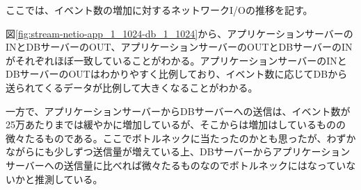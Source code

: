 \documentclass[../../../../../main]{subfiles}
\begin{document}
    \label{subsubsec:result-chunk-only-limit-diskio}

    ここでは、イベント数の増加に対するネットワークI/Oの推移を記す。

    

    図\ref{fig:stream-netio-app_1_1024-db_1_1024}から、アプリケーションサーバーのINとDBサーバーのOUT、アプリケーションサーバーのOUTとDBサーバーのINがそれぞれほぼ一致していることがわかる。アプリケーションサーバーのINとDBサーバーのOUTはわかりやすく比例しており、イベント数に応じてDBから送られてくるデータが比例して大きくなることがわかる。

    一方で、アプリケーションサーバーからDBサーバーへの送信は、イベント数が25万あたりまでは緩やかに増加しているが、そこからは増加はしているものの微々たるものである。ここでボトルネックに当たったのかとも思ったが、わずかながらにも少しずつ送信量が増えている上、DBサーバーからアプリケーションサーバーへの送信量に比べれば微々たるものなのでボトルネックにはなっていないかと推測している。
\end{document}
